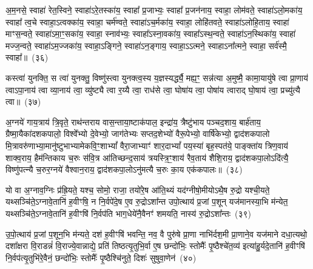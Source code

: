 अ॒म॒नसे॒ स्वाहा॑ रेत॒स्विने॒ स्वाहा॑\-ऽरे॒तस्का॑य॒ स्वाहा᳚ प्र॒जाभ्यः॒ स्वाहा᳚ प्र॒जन॑नाय॒ स्वाहा॒ लोम॑वते॒ स्वाहा॑\-ऽलो॒मका॑य॒ स्वाहा᳚ त्व॒चे स्वाहा॒\-ऽत्वक्का॑य॒ स्वाहा॒ चर्म॑ण्वते॒ स्वाहा॑\-ऽच॒र्मका॑य॒ स्वाहा॒ लोहि॑तवते॒ स्वाहा॑\-ऽलोहि॒ताय॒ स्वाहा॑ माꣳस॒न्वते॒ स्वाहा॑\-ऽमा॒ꣳ॒सका॑य॒ स्वाहा॒ स्नाव॑भ्यः॒ स्वाहा᳚\-ऽस्ना॒वका॑य॒ स्वाहा᳚\-ऽस्थ॒न्वते॒ स्वाहा॑\-ऽन॒स्थिका॑य॒ स्वाहा॑ मज्ज॒न्वते॒ स्वाहा॑\-ऽम॒ज्जका॑य॒ स्वाहा॒\-ऽङ्गिने॒ स्वाहा॑\-ऽन॒ङ्गाय॒ स्वाहा॒\-ऽऽ\-त्मने॒ स्वाहा\-ऽना᳚त्मने॒ स्वाहा॒ सर्व॑स्मै॒ स्वाहा᳚॥~(३६)\ip

{\anuvakamend[{म॒न॒स्विने॒ स्वाहा\-ऽना᳚त्मने॒ स्वाहा॒ द्वे च॑}]}%

कस्त्वा॑ युनक्ति॒ स त्वा॑ युनक्तु॒ विष्णु॑स्त्वा युनक्त्व॒स्य य॒ज्ञस्यर्द्ध्यै॒ मह्य॒ꣳ॒ सन्न॑त्या अ॒मुष्मै॒ कामा॒यायु॑षे त्वा प्रा॒णाय॑ त्वा\-ऽपा॒नाय॑ त्वा व्या॒नाय॑ त्वा॒ व्यु॑ष्ट्यै त्वा र॒य्यै त्वा॒ राध॑से त्वा॒ घोषा॑य त्वा॒ पोषा॑य त्वाराद् घो॒षाय॑ त्वा॒ प्रच्यु॑त्यै त्वा॥~(३७)\ip

{\anuvakamend[{कस्त्वा॒\-ऽष्टात्रिꣳ॑शत्}]}%

अ॒ग्नये॑ गाय॒त्राय॑ त्रि॒वृते॒ राथ॑न्तराय वास॒न्ताया॒ष्टाक॑पाल॒ इन्द्रा॑य॒ त्रैष्टु॑भाय पञ्चद॒शाय॒ बार्\mbox{}ह॑ताय॒ ग्रैष्मा॒यैका॑\-दश\-कपालो॒ विश्वे᳚भ्यो दे॒वेभ्यो॒ जाग॑तेभ्यः सप्तद॒शेभ्यो॑ वैरू॒पेभ्यो॒ वार्\mbox{}षि॑केभ्यो॒ द्वाद॑श\-कपालो मि॒त्रावरु॑णाभ्या॒मानु॑ष्टुभाभ्यामेक\-वि॒ꣳ॒शा\-भ्यां᳚ वैरा॒जाभ्याꣳ॑ शार॒दा\-भ्यां᳚ पय॒स्या॑ बृह॒स्पत॑ये॒ पाङ्क्ता॑य त्रिण॒वाय॑ शाक्व॒राय॒ हैम॑न्तिकाय च॒रुः स॑वि॒त्र आ॑तिच्छन्द॒साय॑ त्रयस्त्रि॒ꣳ॒शाय॑ रैव॒ताय॑ शैशि॒राय॒ द्वाद॑श\-कपा॒लो\-ऽदि॑त्यै॒ विष्णु॑पत्न्यै च॒रुर॒ग्नये॑ वैश्वान॒राय॒ द्वाद॑श\-कपा॒लो\-ऽनु॑मत्यै च॒रुः का॒य एक॑कपालः॥~(३८)\ip

{\anuvakamend[{अ॒ग्नये\-ऽदि॑त्या॒ अनु॑मत्यै स॒प्तच॑त्वारिꣳशत्}]}%

यो वा अ॒ग्नाव॒ग्निः प्र॑ह्रि॒यते॒ यश्च॒ सोमो॒ राजा॒ तयो॑रे॒ष आ॑ति॒थ्यं यद॑ग्नीषो॒मीयो\-ऽथै॒ष रु॒द्रो यश्ची॒यते॒ यथ्सञ्चि॑ते॒\-ऽग्नावे॒तानि॑ ह॒वीꣳषि॒ न नि॒र्वपे॑दे॒ष ए॒व रु॒द्रो\-ऽशा᳚न्त उपो॒त्थाय॑ प्र॒जां प॒शून् यज॑मानस्या॒भि म॑न्येत॒ यथ्सञ्चि॑ते॒\-ऽग्नावे॒तानि॑ ह॒वीꣳषि॑ नि॒र्वप॑ति भाग॒\-धेये॑नै॒वैनꣳ॑ शमयति॒ नास्य॑ रु॒द्रो\-ऽशा᳚न्तः~(३९)\ip

उ॒पो॒त्थाय॑ प्र॒जां प॒शून॒भि म॑न्यते॒ दश॑ ह॒वीꣳषि॑ भवन्ति॒ नव॒ वै पुरु॑षे प्रा॒णा नाभि॑र्दश॒मी प्रा॒णाने॒व यज॑माने दधा॒त्यथो॒ दशा᳚क्षरा वि॒राडन्नं॑ वि॒राज्ये॒वान्नाद्ये॒ प्रति॑ तिष्ठत्यृ॒तुभि॒र्वा ए॒ष छन्दो॑भिः॒ स्तोमैः᳚ पृ॒ष्ठैश्चे॑त॒व्य॑ इत्या॑हु॒र्यदे॒तानि॑ ह॒वीꣳषि॑ नि॒र्वप॑त्यृ॒तुभि॑रे॒वैनं॒ छन्दो॑भिः॒ स्तोमैः᳚ पृ॒ष्ठैश्चि॑नुते॒ दिशः॑ सुषुवा॒णेन॑~(४०)\ip

